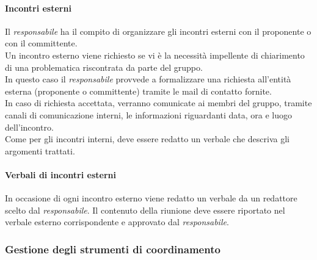       \paragraph{Incontri esterni}
        Il \textit{responsabile} ha il compito di organizzare gli incontri esterni con il proponente o con il committente.\\
        Un incontro esterno viene richiesto se vi è la necessità impellente di chiarimento di una problematica riscontrata da parte del gruppo.\\
        In questo caso il \textit{responsabile} provvede a formalizzare una richiesta all’entità esterna (proponente o committente) tramite le mail di contatto fornite.\\
        In caso di richiesta accettata, verranno comunicate ai membri del gruppo, tramite canali di comunicazione interni, le informazioni riguardanti data, ora e luogo dell’incontro.\\
        Come per gli incontri interni, deve essere redatto un verbale che descriva gli argomenti trattati.
      \paragraph {Verbali di incontri esterni}
      In occasione di ogni incontro esterno viene redatto un verbale da un redattore scelto dal \textit{responsabile}. Il contenuto della riunione deve essere riportato nel verbale esterno corrispondente e approvato dal \textit{responsabile}.

    \subsubsection{Gestione degli strumenti di coordinamento}
